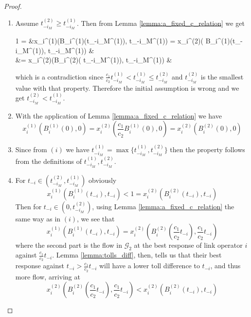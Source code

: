 \documentclass[10pt,a4paper]{book}
\newcommand{\Gm}{\mathcal{G}}
\theoremstyle{definition}
\theoremstyle{comment}
\begin{document}
\begin{proof}
	$ $
	\begin{enumerate}[$(i)$]
		\item Assume $t_{-i_M}^{(2)} \ge t_{-i_M}^{(1)}$.
		Then from Lemma \ref{lemma:a_fixed_c_relation} we get
		\begin{flalign*}
			1 = &x_i^{(1)}(B_i^{(1)}(t_{-i_M}^{(1)}), t_{-i_M}^{(1)}) = x_i^{(2)}\left(  B_i^{(1)}(t_{-i_M}^{(1)}),  t_{-i_M}^{(1)}\right) & \\
			&= x_i^{(2)}\left(B_i^{(2)}\left( t_{-i_M}^{(1)}\right),  t_{-i_M}^{(1)}\right) &
		\end{flalign*}
		which is a contradiction since $\frac{c_1}{c_2} t_{-i_M}^{(1)} < t_{-i_M}^{(1)} \le t_{-i_M}^{(2)}$ and $t_{-i_M}^{(2)}$ is the smallest value with that property.
		Therefore the initial assumption is wrong and we get $t_{-i_M}^{(2)} < t_{-i_M}^{(1)}$.
		\item With the application of Lemma \ref{lemma:a_fixed_c_relation} we have
		\[
			x_i^{(1)}(B_i^{(1)}(0), 0) = x_i^{(2)}\left(\frac{c_1}{c_2} B_i^{(1)}(0), 0\right) = x_i^{(2)}(B_i^{(2)}(0), 0)
		\]
		\item Since from $(i)$ we have $t_{-i_M}^{(1)} = \max\{t_{-i_M}^{(1)}, t_{-i_M}^{(2)}\}$ then the property follows from the definitions of $t_{-i_M}^{(1)}, t_{-i_M}^{(2)}$.
		\item For $t_{-i} \in (t_{-i_M}^{(2)}, t_{-i_M}^{(1)})$ obviously
		\[
			x_i^{(1)}(B_i^{(1)}(t_{-i}), t_{-i}) < 1 = x_i^{(2)}(B_i^{(2)}(t_{-i}), t_{-i})
		\]
		Then for $t_{-i} \in (0, t_{-i_M}^{(2)})$, using Lemma \ref{lemma:a_fixed_c_relation} the same way as in $(i)$, we see that
		\[
		x_i^{(1)}(B_i^{(1)}(t_{-i}), t_{-i}) = x_i^{(2)}\left(B_i^{(2)}\left(\frac{c_1}{c_2} t_{-i}\right), \frac{c_1}{c_2} t_{-i}\right)
		\]
		where the second part is the flow in $\Gm_2$ at the best response of link operator $i$ against $\frac{c_1}{c_2} t_{-i}$.
		Lemma \ref{lemma:tolls_diff}, then, tells us that their best response against $t_{-i} > \frac{c_1}{c_2} t_{-i}$ will have a lower toll difference to $t_{-i}$, and thus more flow, arriving at
		\[
			x_i^{(2)}\left(B_i^{(2)}\left(\frac{c_1}{c_2} t_{-i}\right), \frac{c_1}{c_2} t_{-i}\right) < x_i^{(2)}(B_i^{(2)}(t_{-i}), t_{-i})
		\]
	\end{enumerate}
\end{proof}
\end{document}
